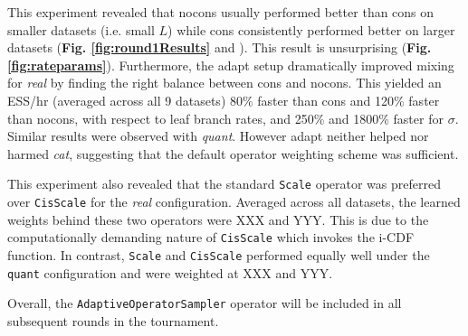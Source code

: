 \documentclass[10pt,letterpaper]{article}
\begin{document}
This experiment revealed that nocons usually performed better than cons on smaller datasets (i.e. small $L$) while cons consistently performed better on larger datasets (\textbf{Fig. \ref{fig:round1Results}} and \textbf{}). 
This result is unsurprising (\textbf{Fig. \ref{fig:rateparams}}).
Furthermore, the adapt setup dramatically improved mixing for \textit{real} by finding the right balance between cons and nocons.
This yielded an ESS/hr (averaged across all 9 datasets) 80\% faster than cons and 120\% faster than nocons, with respect to leaf branch rates, and 250\% and 1800\% faster for $\sigma$.
Similar results were observed with \textit{quant}.
However adapt neither helped nor harmed \textit{cat}, suggesting that the default operator weighting scheme was sufficient.


This experiment also revealed that the standard \texttt{Scale} operator was preferred over \texttt{CisScale} for the \textit{real} configuration. Averaged across all datasets, the learned weights behind these two operators were XXX and YYY.
This is due to the computationally demanding nature of \texttt{CisScale} which invokes the i-CDF function.
In contrast, \texttt{Scale} and \texttt{CisScale} performed equally well under the \texttt{quant} configuration and were weighted at XXX and YYY.


Overall, the \texttt{AdaptiveOperatorSampler} operator will be included in all subsequent rounds in the tournament. 
\end{document}
